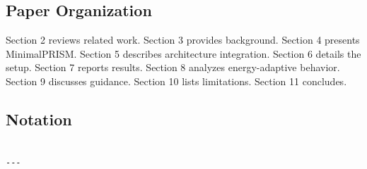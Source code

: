 \subsection{Paper Organization}

Section 2 reviews related work. Section 3 provides background. Section 4 
presents MinimalPRISM. Section 5 describes architecture integration. Section 
6 details the setup. Section 7 reports results. Section 8 analyzes 
energy-adaptive behavior. Section 9 discusses guidance. Section 10 lists 
limitations. Section 11 concludes.



\subsection{Notation}

\begin{lstlisting}

---
\end{lstlisting}